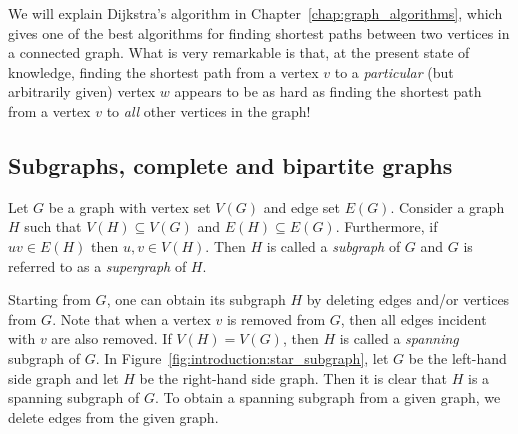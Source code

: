 We will explain Dijkstra's algorithm in
Chapter~\ref{chap:graph_algorithms}, which gives one of the best
algorithms for finding shortest paths between two vertices in a
connected graph. What is very remarkable is that, at the present state
of knowledge, finding the shortest path from a vertex $v$ to a
\emph{particular} (but arbitrarily given) vertex $w$ appears to be as
hard as finding the shortest path from a vertex $v$ to \emph{all}
other vertices in the graph!



\subsection{Subgraphs, complete and bipartite graphs}

\begin{definition}
Let $G$ be a graph with vertex set $V(G)$ and edge set
$E(G)$. Consider a graph $H$ such that $V(H) \subseteq V(G)$ and $E(H)
\subseteq E(G)$. Furthermore, if $uv \in E(H)$ then $u,v \in
V(H)$. Then $H$ is called a \emph{subgraph} of $G$ and $G$ is referred
to as a \emph{supergraph} of $H$.
\end{definition}

Starting from $G$, one can obtain its subgraph $H$ by deleting edges
and/or vertices from $G$. Note that when a vertex $v$ is removed from
$G$, then all edges incident with $v$ are also removed. If $V(H) =
V(G)$, then $H$ is called a \emph{spanning} subgraph of $G$. In
Figure~\ref{fig:introduction:star_subgraph}, let $G$ be the left-hand
side graph and let $H$ be the right-hand side graph. Then it is clear
that $H$ is a spanning subgraph of $G$. To obtain a spanning subgraph
from a given graph, we delete edges from the given graph.


